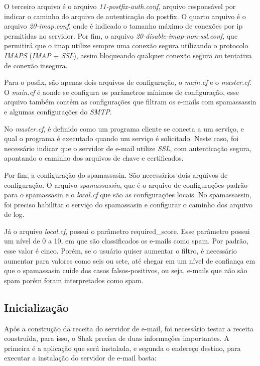 O terceiro arquivo é o arquivo \textit{11-postfix-auth.conf}, arquivo responsável por 
indicar o caminho do arquivo de autenticação
do postfix. O quarto arquivo é o arquivo \textit{20-imap.conf}, onde é indicado o tamanho
máximo de conexões por ip permitidas no servidor. Por fim, o arquivo
\textit{20-disable-imap-non-ssl.conf}, que permitirá que o imap utilize sempre uma conexão
segura utilizando o protocolo \textit{IMAPS} (\textit{IMAP} + \textit{SSL}), assim bloqueando 
qualquer conexão segura ou tentativa de conexão insegura.

Para o posfix, são apenas dois arquivos de configuração, o \textit{main.cf} e o 
\textit{master.cf}.
O \textit{main.cf} é aonde se configura os parâmetros mínimos de configuração, esse arquivo
também contém as configurações que filtram os e-mails com spamassassin e 
algumas configurações do \textit{SMTP}. 

No \textit{master.cf}, é definido como um programa cliente se conecta a um serviço, e qual o
programa é executado quando um serviço é solicitado. Neste caso, foi necessário
indicar que o servidor de e-mail utilize \textit{SSL}, com autenticação segura, 
apontando o caminho dos arquivos de chave e certificados.

Por fim, a configuração do spamassasin. São necessários dois arquivos de configuração.
O arquivo \textit{spamassassin}, que é o arquivo de configurações padrão para o spamassasin e o
\textit{local.cf} que são as configurações locais. No spamassassin, foi preciso habilitar 
o serviço do spamassasin e configurar o caminho dos arquivo de log.

Já o arquivo \textit{local.cf}, possui o parâmetro required\_score. Esse parâmetro 
possui um nível de 0 a 10, em que 
são classificados os e-mails como spam. Por padrão, esse valor é cinco. Porém, se 
o usuário quiser aumentar o filtro, é necessário aumentar para valores como seis ou sete, 
até chegar em um nível de confiança em que o spamassasin cuide dos casos falsos-positivos, 
ou seja, e-mails que não são spam porém foram interpretados como spam.

\subsection{Inicialização}

Após a construção da receita do servidor de e-mail, foi necessário testar a receita construída,
para isso, o Shak precisa de duas informações importantes. A primeira é a aplicação
que será instalada, e segunda o endereço destino, para executar a instalação
do servidor de e-mail basta:

